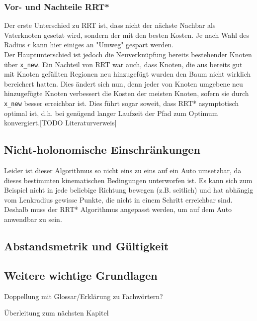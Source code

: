 \subsubsection{Vor- und Nachteile RRT*}
Der erste Unterschied zu RRT ist, dass nicht der nächste Nachbar als Vaterknoten gesetzt wird, sondern der mit den besten Kosten. Je nach Wahl des Radius $r$ kann hier einiges an "Umweg" gespart werden. \\
Der Hauptunterschied ist jedoch die Neuverknüpfung bereits bestehender Knoten über \verb|x_new|. Ein Nachteil von RRT war auch, dass Knoten, die aus bereits gut mit Knoten gefüllten Regionen neu hinzugefügt wurden den Baum nicht wirklich bereichert hatten. Dies ändert sich nun, denn jeder von Knoten umgebene neu hinzugefügte Knoten verbessert die Kosten der meisten Knoten, sofern sie durch \verb|x_new| besser erreichbar ist. Dies führt sogar soweit, dass RRT* asymptotisch optimal ist, d.h. bei genügend langer Laufzeit der Pfad zum Optimum konvergiert.[TODO Literaturverweis]
\subsection{Nicht-holonomische Einschränkungen}
Leider ist dieser Algorithmus so nicht eins zu eins auf ein Auto umsetzbar, da dieses bestimmten kinematischen Bedingungen unterworfen ist. Es kann sich zum Beispiel nicht in jede beliebige Richtung bewegen (z.B. seitlich) und hat abhängig vom Lenkradius gewisse Punkte, die nicht in einem Schritt erreichbar sind. Deshalb muss der RRT* Algorithmus angepasst werden, um auf dem Auto anwendbar zu sein.
\subsection{Abstandsmetrik und Gültigkeit}
\subsection{Weitere wichtige Grundlagen}
Doppellung mit Glossar/Erklärung zu Fachwörtern?



Überleitung zum nächsten Kapitel